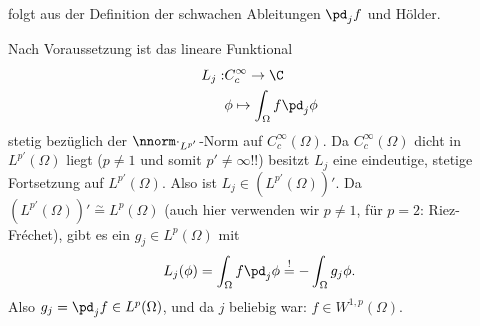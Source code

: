 \begin{beweis}
 folgt aus der Definition der schwachen Ableitungen $\pd_{j}f$ und Hölder. 

 Nach Voraussetzung ist das lineare Funktional
\begin{align*}
  L_{j}:& C_{c}^{\infty} \to \C\\
  &\phi \mapsto \int_{\Omega}f \pd_{j}\phi
\end{align*}
stetig bezüglich der $\nnorm\cdot_{L^{p'}}$-Norm auf $C_{c}^{\infty}(\Omega)$. Da $C_{c}^{\infty}(\Omega)$ dicht in $L^{p'}(\Omega)$ liegt ($p \neq 1$ und somit $p' \neq \infty$!!) besitzt $L_{j}$ eine eindeutige, stetige Fortsetzung auf $L^{p'}(\Omega)$. Also ist $L_{j} \in (L^{p'}(\Omega))'$. Da $(L^{p'}(\Omega))' \stackrel \sim = L^{p}(\Omega)$ (auch hier verwenden wir $p \neq 1$, für $p = 2$: Riez-Fréchet), gibt es ein $g_{j} \in L^{p}(\Omega)$ mit
\begin{align*}
  L_{j}(\phi) = \int_{\Omega}f \pd_{j}\phi \stackrel != -\int_{\Omega}g_{j}\phi. 
\end{align*}
 Also $g_{j} = \pd_{j}f \in L^{p}(\Omega)$, und da $j$ beliebig war: $f \in W^{1, p}(\Omega)$.


\end{beweis}
